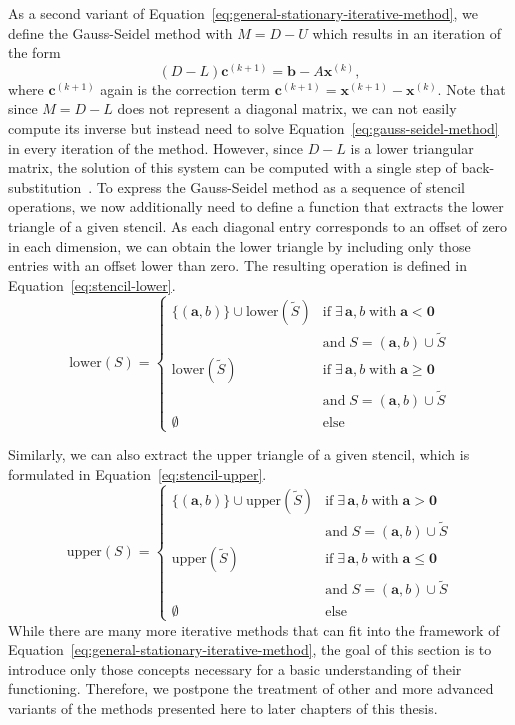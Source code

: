 As a second variant of Equation~\eqref{eq:general-stationary-iterative-method}, we define the Gauss-Seidel method with $M = D - U$ which results in an iteration of the form
\begin{equation}
	(D - L) \bm{c}^{(k+1)} = \bm{b} - A \bm{x}^{(k)}, 
	\label{eq:gauss-seidel-method}
\end{equation}
where $\bm{c}^{(k+1)}$ again is the correction term $\bm{c}^{(k+1)} = \bm{x}^{(k+1)} - \bm{x}^{(k)}$.
Note that since $M = D - L$ does not represent a diagonal matrix, we can not easily compute its inverse but instead need to solve Equation~\eqref{eq:gauss-seidel-method} in every iteration of the method.
However, since $D - L$ is a lower triangular matrix, the solution of this system can be computed with a single step of back-substitution~\cite{saad2003iterative}. 
To express the Gauss-Seidel method as a sequence of stencil operations, we now additionally need to define a function that extracts the lower triangle of a given stencil.
As each diagonal entry corresponds to an offset of zero in each dimension, we can obtain the lower triangle by including only those entries with an offset lower than zero.
The resulting operation is defined in Equation~\eqref{eq:stencil-lower}.
\begin{equation}
	\text{lower}(S) = \begin{cases}
		\{(\bm{a}, b) \} \cup \text{lower}(\tilde{S}) & \text{if} \; \exists\, \bm a, b \; \text{with} \; \bm a < \bm 0 \\ & \text{and} \; S = (\bm a, b) \cup \tilde{S} \\
		\text{lower}(\tilde{S}) & \text{if} \; \exists\, \bm a, b \; \text{with} \; \bm a \geq \bm 0 \\ & \text{and} \; S = (\bm a, b) \cup \tilde{S} \\
		\emptyset & \text{else}
	\end{cases}
	\label{eq:stencil-lower}
\end{equation}

Similarly, we can also extract the upper triangle of a given stencil, which is formulated in Equation~\eqref{eq:stencil-upper}.
\begin{equation}
	\text{upper}(S) = \begin{cases}
		\{(\bm{a}, b) \} \cup \text{upper}(\tilde{S}) & \text{if} \; \exists\, \bm a, b \; \text{with} \; \bm a > \bm 0 \\ & \text{and} \; S = (\bm a, b) \cup \tilde{S} \\
		\text{upper}(\tilde{S}) & \text{if} \; \exists\, \bm a, b \; \text{with} \; \bm a \leq \bm 0 \\ & \text{and} \; S = (\bm a, b) \cup \tilde{S} \\
		\emptyset & \text{else}
	\end{cases}
	\label{eq:stencil-upper}
\end{equation}
While there are many more iterative methods that can fit into the framework of Equation~\eqref{eq:general-stationary-iterative-method}, the goal of this section is to introduce only those concepts necessary for a basic understanding of their functioning.
Therefore, we postpone the treatment of other and more advanced variants of the methods presented here to later chapters of this thesis.

